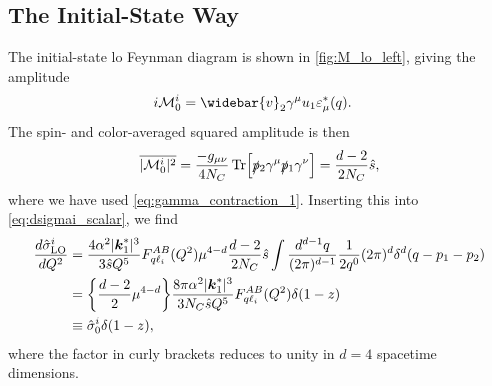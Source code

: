 \subsection{The Initial-State Way}
The initial-state \gls{lo} Feynman diagram is shown in \cref{fig:M_lo_left}, giving the amplitude
\begin{align}\label{eq:Mi_lo}
    i\M^i_0 &= \widebar{v}_2\gamma^\mu u_1 \eps^*_\mu(q).
\end{align}
The spin- and color-averaged squared amplitude is then
\begin{equation}
    \overline{\lvert\mathcal{M}^i_0\rvert^2} = \frac{-g_{\mu\nu}}{4N_C}\operatorname{Tr}\Bigl[ \slashed{p}{}_2 \gamma^\mu \slashed{p}{}_1 \gamma^\nu \Bigr]
    = \frac{d-2}{2N_C}\hat{s},
\end{equation}
where we have used \cref{eq:gamma_contraction_1}.
Inserting this into \cref{eq:dsigmai_scalar}, we find
\begin{align}
    \frac{d\hat{\sigma}^i_\mathrm{LO}}{dQ^2} &= \frac{4\alpha^2 \lvert\boldsymbol{k}_1^*\rvert^3}{3\hat{s} Q^5}F_{q\ell_i}^{AB}(Q^2) 
    \mu^{4-d} \frac{d-2}{2N_C}\hat{s} \int \frac{d^{d-1}q}{(2\pi)^{d-1}}\frac{1}{2q^0} (2\pi)^d \delta^d(q-p_1-p_2)
    \nonumber \\
    &= \biggl\{ \frac{d-2}{2} \mu^{4-d} \biggr\}
    \frac{8\pi\alpha^2 \lvert\boldsymbol{k}_1^*\rvert^3}{3N_C\hat{s} Q^5}F_{q\ell_i}^{AB}(Q^2) \delta(1-z)
    \nonumber \\
    &\equiv \hat{\sigma}^i_{0} \delta(1-z),
    \label{eq:sigma0i}
\end{align}
where the factor in curly brackets reduces to unity in $d=4$ spacetime dimensions.


